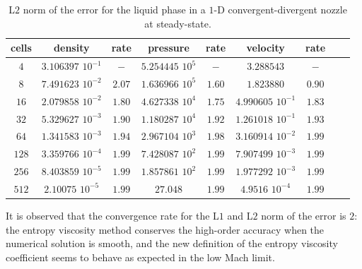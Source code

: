 \documentclass[preprint,10pt]{elsarticle}
\begin{document}
\begin{table}[H]
\begin{center}
 \caption{\label{tbl:l2_norm_liq} L$2$ norm of the error for the liquid phase in a $1$-D convergent-divergent nozzle at steady-state.}
 \begin{tabular}{|c|c|c|c|c|c|c|c|c|}
 \hline
   cells & density & rate & pressure & rate & velocity & rate \\
 \hline
$4$ &   $3.106397$ $10^{-1}$ & $-$ & $5.254445$ $10^{5}$ & $-$ & $3.288543$                   & $-$\\
  \hline
$8$  &  $7.491623$ $10^{-2}$ & $2.07$ & $1.636966$ $10^{5}$ & $1.60$ & $1.823880$                   & $0.90$\\
   \hline
$16$ & $2.079858$ $10^{-2}$ & $1.80$ & $4.627338$ $10^{4}$ & $1.75$ & $4.990605$ $10^{-1}$ & $1.83$\\
 \hline
$32$ & $5.329627$ $10^{-3}$ & $1.90$ & $1.180287$ $10^{4}$ & $1.92$ & $1.261018$ $10^{-1}$ & $1.93$\\
 \hline
$64$ & $1.341583$ $10^{-3}$ & $1.94$ & $2.967104$ $10^{3}$ & $1.98$ & $3.160914$ $10^{-2}$ & $1.99$\\
 \hline
$128$&$3.359766$ $10^{-4}$ & $1.99$ & $7.428087$ $10^{2}$ & $1.99$ & $7.907499$ $10^{-3}$ & $1.99$\\
 \hline
$256$&$8.403859$ $10^{-5}$& $1.99$ & $1.857861$ $10^{2}$ & $1.99$ & $1.977292$ $10^{-3}$ & $1.99$\\
 \hline
 $512$&$2.10075$ $10^{-5}$& $1.99$ & $27.048$ & $1.99$ & $4.9516$ $10^{-4}$ & $1.99$\\
 \hline
\end{tabular}
\end{center}
\nonumber
\end{table}
It is observed that the convergence rate for the L$1$ and L$2$ norm of the error is $2$: the entropy viscosity method conserves the high-order accuracy when the numerical solution is smooth, and the new definition of the entropy viscosity coefficient seems to behave as expected in the low Mach limit.
\end{document}
